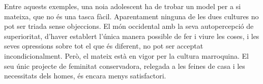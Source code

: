 Entre aquests exemples, una noia adolescent ha de trobar un model per a si mateixa, que no és una tasca fàcil.
Aparentament ninguna de les dues cultures no pot ser triada sense objeccions.
El món occidental amb la seva autopercepció de superioritat, d'haver establert l'única manera possible de fer i viure les coses, i les seves opressions sobre tot el que és diferent, no pot ser acceptat incondicionalment.
Però, el mateix està en vigor per la cultura marroquina.
El seu únic projecte de feminitat conservadora, relegada a les feines de casa i les necessitats dels homes, és encara menys satisfactori.

\begin{comment}
  1) la cultura d'origen representada per
     * el pare
     * la mare
     * la família amb els avis i les tietes
     * els moros de Catalunya
  2) la cultura d'acollida, representada per
     * l'escola
     * les amigues
     * les amants del pare

+ stereotips mútuus de cada grup per l'altre
\end{comment}

